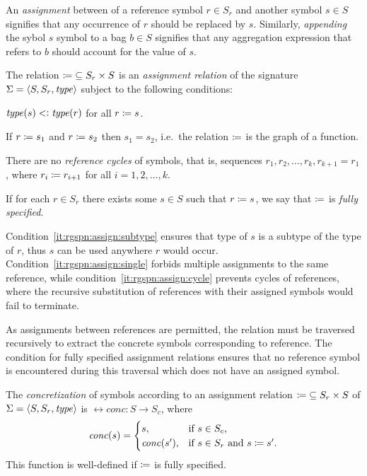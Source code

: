 An \emph{assignment} between of a reference symbol \(r \in S_r\) and another symbol \(s \in S\) signifies that any occurrence of \(r\) should be replaced by \(s\). Similarly, \emph{appending} the sybol \(s\) symbol to a bag \(b \in S\) signifies that any aggregation expression that refers to \(b\) should account for the value of \(s\).

\begin{dfn}
  \label{dfn:rgspn:assign}
  The relation \({\coloneq} \subseteq S_r \times S\) is an \emph{ assignment relation} of the signature \(\Sigma = \langle S, S_r, \textrm{\itshape type\/} \rangle\) subject to the following conditions:
  \begin{compactenum}
  \item \(\textrm{\itshape type\/}(s) \mathrel{<\vcentcolon} \textrm{\itshape type\/}(r)\) for all \(r \coloneq s\). \label{it:rgspn:assign:subtype}
  \item If \(r \coloneq s_1\) and \(r \coloneq s_2\) then \(s_1 = s_2\), i.e.~the relation \(\coloneq\) is the graph of a function. \label{it:rgspn:assign:single}
  \item There are no \emph{reference cycles} of symbols, that is, sequences \(r_1, r_2, \ldots, r_k, r_{k + 1} = r_1\), where \(r_i \coloneq r_{i + 1}\) for all \(i = 1, 2, \ldots, k\). \label{it:rgspn:assign:cycle}
  \end{compactenum}
  If for each \(r \in S_r\) there exists some \(s \in S\) such that \(r \coloneq s\), we say that \(\coloneq\) is \emph{fully specified}.
\end{dfn}

Condition~\ref{it:rgspn:assign:subtype} ensures that type of \(s\) is a subtype of the type of \(r\), thus \(s\) can be used anywhere \(r\) would occur. Condition~\ref{it:rgspn:assign:single} forbids multiple assignments to the same reference, while condition~\ref{it:rgspn:assign:cycle} prevents cycles of references, where the recursive substitution of references with their assigned symbols would fail to terminate.

As assignments between references are permitted, the relation  must be traversed recursively to extract the concrete symbols corresponding to reference. The condition for fully specified assignment relations ensures that no reference symbol is encountered during this traversal which does not have an assigned symbol. 
\begin{dfn}
  The \emph{concretization} of symbols according to an  assignment relation \({\coloneq} \subseteq S_r \times S\) of \(\Sigma = \langle S, S_r, \textrm{\itshape type\/} \rangle\) is \(\rel{conc}\colon S \to S_c\), where
  \begin{equation}
    \textrm{\itshape conc\/}(s) = \begin{cases}
      s, & \text{if \(s \in S_c\),} \\
      \textrm{\itshape conc\/}(s'), & \text{if \(s \in S_r\) and \(s \coloneq s'\).}
    \end{cases}
  \end{equation}
  This function is well-defined if \(\coloneq\) is fully specified.
\end{dfn}

